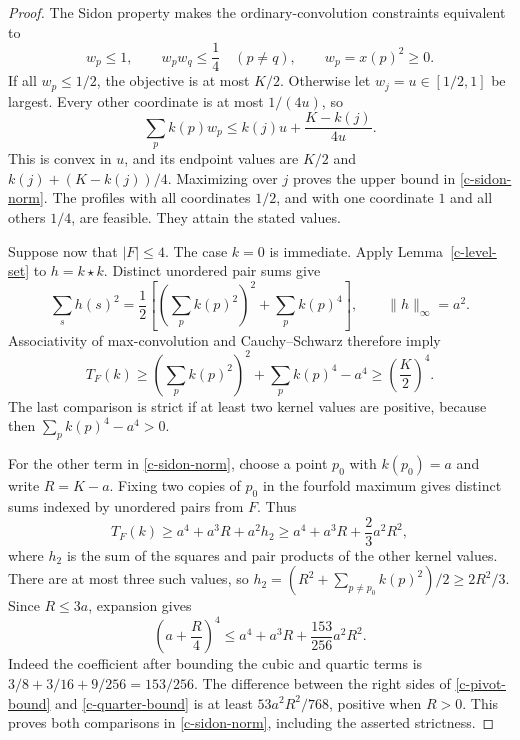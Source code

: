 \begin{proof}
The Sidon property makes the ordinary-convolution constraints equivalent to
\[
 w_p\le1,\qquad w_pw_q\le\frac14\quad(p\ne q),
 \qquad w_p=x(p)^2\ge0.
\]
If all $w_p\le1/2$, the objective is at most $K/2$.  Otherwise let
$w_j=u\in[1/2,1]$ be largest.  Every other coordinate is at most
$1/(4u)$, so
\[
 \sum_p k(p)w_p\le k(j)u+\frac{K-k(j)}{4u}.
\]
This is convex in $u$, and its endpoint values are $K/2$ and
$k(j)+(K-k(j))/4$.  Maximizing over $j$ proves the upper bound in
\eqref{c-sidon-norm}.  The profiles with all coordinates $1/2$, and
with one coordinate $1$ and all others $1/4$, are feasible.  They attain
the stated values.

Suppose now that $|F|\le4$.  The case $k=0$ is immediate.  Apply
Lemma~\ref{c-level-set} to $h=k\star k$.  Distinct unordered pair sums
give
\[
 \sum_s h(s)^2
 =\frac12\left[\left(\sum_p k(p)^2\right)^2+\sum_p k(p)^4\right],
 \qquad \|h\|_\infty=a^2.
\]
Associativity of max-convolution and Cauchy--Schwarz therefore imply
\begin{equation}\label{c-sidon-half}
 T_F(k)\ge
 \left(\sum_p k(p)^2\right)^2+\sum_p k(p)^4-a^4
 \ge\left(\frac K2\right)^4.
\end{equation}
The last comparison is strict if at least two kernel values are positive,
because then $\sum_p k(p)^4-a^4>0$.

For the other term in \eqref{c-sidon-norm}, choose a point $p_0$ with
$k(p_0)=a$ and write $R=K-a$.  Fixing two copies of $p_0$ in the
fourfold maximum gives distinct sums indexed by unordered pairs from $F$.
Thus
\begin{equation}\label{c-pivot-bound}
 T_F(k)\ge a^4+a^3R+a^2h_2
 \ge a^4+a^3R+\frac23a^2R^2,
\end{equation}
where $h_2$ is the sum of the squares and pair products of the other
kernel values.  There are at most three such values, so
$h_2=(R^2+\sum_{p\ne p_0}k(p)^2)/2\ge2R^2/3$.
Since $R\le3a$, expansion gives
\begin{equation}\label{c-quarter-bound}
 \left(a+\frac R4\right)^4
 \le a^4+a^3R+\frac{153}{256}a^2R^2.
\end{equation}
Indeed the coefficient after bounding the cubic and quartic terms is
$3/8+3/16+9/256=153/256$.  The difference between the right sides of
\eqref{c-pivot-bound} and \eqref{c-quarter-bound} is at least
$53a^2R^2/768$, positive when $R>0$.  This proves both comparisons in
\eqref{c-sidon-norm}, including the asserted strictness.
\end{proof}


